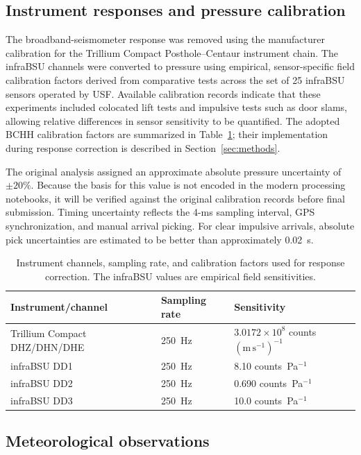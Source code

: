 \documentclass[]{seismica}
\begin{document}
\subsection{Instrument responses and pressure calibration}

The broadband-seismometer response was removed using the manufacturer
calibration for the Trillium Compact Posthole--Centaur instrument chain. The
infraBSU channels were converted to pressure using empirical, sensor-specific
field calibration factors derived from comparative tests across the set of 25
infraBSU sensors operated by USF. Available calibration records indicate that
these experiments included colocated lift tests and impulsive tests such as
door slams, allowing relative differences in sensor sensitivity to be
quantified. The adopted BCHH calibration factors are summarized in
Table~\ref{tab:instrument_calibration}; their implementation during response
correction is described in Section~\ref{sec:methods}.

The original analysis assigned an approximate absolute pressure uncertainty of
$\pm20\%$. Because the basis for this value is not encoded in the modern
processing notebooks, it will be verified against the original calibration
records before final submission. Timing uncertainty reflects the 4-ms sampling
interval, GPS synchronization, and manual arrival picking. For clear impulsive
arrivals, absolute pick uncertainties are estimated to be better than
approximately 0.02~s.

\begin{table}
\centering
\caption{Instrument channels, sampling rate, and calibration factors used for
response correction. The infraBSU values are empirical field sensitivities.}
\label{tab:instrument_calibration}
\begin{tabular}{lll}
\hline
Instrument/channel & Sampling rate & Sensitivity \\
\hline
Trillium Compact DHZ/DHN/DHE
  & 250~Hz
  & $3.0172\times10^8$ counts $(\mathrm{m\,s^{-1}})^{-1}$ \\
infraBSU DD1
  & 250~Hz
  & 8.10 counts~Pa$^{-1}$ \\
infraBSU DD2
  & 250~Hz
  & 0.690 counts~Pa$^{-1}$ \\
infraBSU DD3
  & 250~Hz
  & 10.0 counts~Pa$^{-1}$ \\
\hline
\end{tabular}
\end{table}


\subsection{Meteorological observations}
\end{document}
